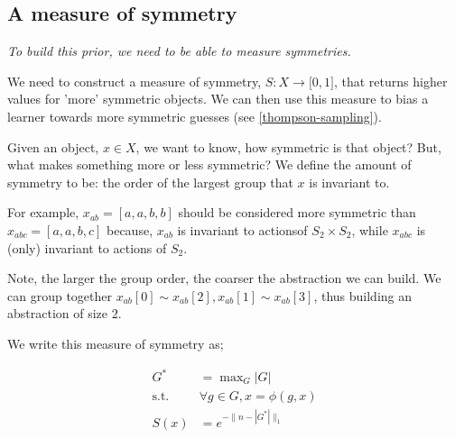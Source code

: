 
\subsection{A measure of symmetry}\label{measure-symmetry}

\begin{displayquote}
	\textsl{To build this prior, we need to be able to measure symmetries.}
\end{displayquote}

We need to construct a measure of symmetry, $S: X \to \mathbb [0, 1]$, that returns higher values for 'more' symmetric objects.
We can then use this measure to bias a learner towards more symmetric guesses (see \ref{thompson-sampling}).

Given an object, $x \in X$, we want to know, how symmetric is that object?
But, what makes something more or less symmetric?
We define the amount of symmetry to be: the order \footnotemark of the largest group that $x$ is invariant to.


For example, $x_{ab} = [a,a,b,b]$ should be considered more symmetric than $x_{abc} = [a,a,b,c]$ because,
$x_{ab}$ is invariant to actions\footnotemark of $S_2 \times S_2$, while $x_{abc}$ is (only) invariant to actions of $S_2$.


Note, the larger the group order, the coarser the abstraction we can build. We can group together $x_{ab}[0] \sim x_{ab}[2], x_{ab}[1] \sim x_{ab}[3]$, thus building an abstraction of size $2$.

We write this measure of symmetry as;

\begin{align*}
G^{* } &= \mathop{\text{max}}_G |G| \tag{pick the largest group}\\
\text{s.t.} \;\; &\forall g\in G, x = \phi(g, x) \tag{that $x$ is invariant to} \\
S(x) &= e^{-\parallel n-|G^{* }| \parallel_1} \tag{transform so $S(x)\in [0, 1]$}
\end{align*}

